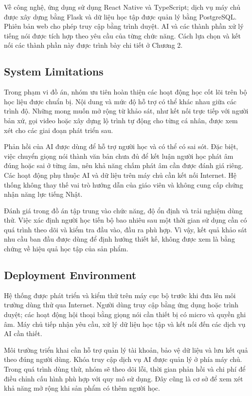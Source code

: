 Về công nghệ, ứng dụng sử dụng React Native và TypeScript; dịch vụ máy chủ được xây dựng bằng Flask và dữ liệu học tập được quản lý bằng PostgreSQL. Phiên bản web cho phép truy cập bằng trình duyệt. AI và các thành phần xử lý tiếng nói được tích hợp theo yêu cầu của từng chức năng. Cách lựa chọn và kết nối các thành phần này được trình bày chi tiết ở Chương 2.

\subsection{System Limitations}

Trong phạm vi đồ án, nhóm ưu tiên hoàn thiện các hoạt động học cốt lõi trên bộ học liệu được chuẩn bị. Nội dung và mức độ hỗ trợ có thể khác nhau giữa các trình độ. Những mong muốn mở rộng từ khảo sát, như kết nối trực tiếp với người bản xứ, gọi video hoặc xây dựng lộ trình tự động cho từng cá nhân, được xem xét cho các giai đoạn phát triển sau.

Phản hồi của AI được dùng để hỗ trợ người học và có thể có sai sót. Đặc biệt, việc chuyển giọng nói thành văn bản chưa đủ để kết luận người học phát âm đúng hoặc sai ở từng âm, nên khả năng chấm phát âm cần được đánh giá riêng. Các hoạt động phụ thuộc AI và dữ liệu trên máy chủ cần kết nối Internet. Hệ thống không thay thế vai trò hướng dẫn của giáo viên và không cung cấp chứng nhận năng lực tiếng Nhật.

Đánh giá trong đồ án tập trung vào chức năng, độ ổn định và trải nghiệm dùng thử. Việc xác định người học tiến bộ bao nhiêu sau một thời gian sử dụng cần có quá trình theo dõi và kiểm tra đầu vào, đầu ra phù hợp. Vì vậy, kết quả khảo sát nhu cầu ban đầu được dùng để định hướng thiết kế, không được xem là bằng chứng về hiệu quả học tập của sản phẩm.

\subsection{Deployment Environment}

Hệ thống được phát triển và kiểm thử trên máy cục bộ trước khi đưa lên môi trường dùng thử qua Internet. Người dùng truy cập bằng ứng dụng hoặc trình duyệt; các hoạt động hội thoại bằng giọng nói cần thiết bị có micro và quyền ghi âm. Máy chủ tiếp nhận yêu cầu, xử lý dữ liệu học tập và kết nối đến các dịch vụ AI cần thiết.

Môi trường triển khai cần hỗ trợ quản lý tài khoản, bảo vệ dữ liệu và lưu kết quả theo đúng người dùng. Khóa truy cập dịch vụ AI được quản lý ở phía máy chủ. Trong quá trình dùng thử, nhóm sẽ theo dõi lỗi, thời gian phản hồi và chi phí để điều chỉnh cấu hình phù hợp với quy mô sử dụng. Đây cũng là cơ sở để xem xét khả năng mở rộng khi sản phẩm có thêm người học.

